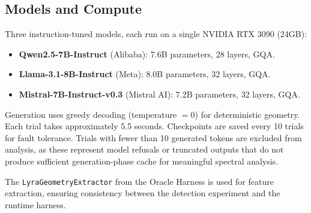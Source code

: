\subsection{Models and Compute}

Three instruction-tuned models, each run on a single NVIDIA RTX 3090
(24GB):

\begin{itemize}[nosep]
  \item \textbf{Qwen2.5-7B-Instruct} (Alibaba): 7.6B parameters,
    28 layers, GQA.
  \item \textbf{Llama-3.1-8B-Instruct} (Meta): 8.0B parameters,
    32 layers, GQA.
  \item \textbf{Mistral-7B-Instruct-v0.3} (Mistral AI): 7.2B
    parameters, 32 layers, GQA.
\end{itemize}

Generation uses greedy decoding (temperature $= 0$) for deterministic
geometry. Each trial takes approximately 5.5 seconds. Checkpoints are
saved every 10 trials for fault tolerance. Trials with fewer than 10
generated tokens are excluded from analysis, as these represent model
refusals or truncated outputs that do not produce sufficient
generation-phase cache for meaningful spectral analysis.

The \texttt{LyraGeometryExtractor} from the Oracle Harness is used for
feature extraction, ensuring consistency between the detection experiment
and the runtime harness.
